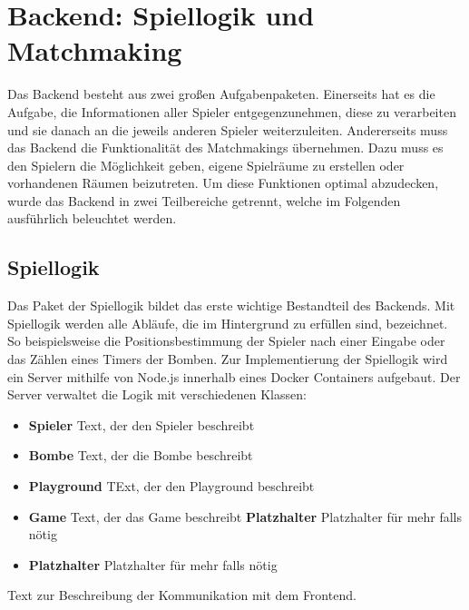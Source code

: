 \documentclass[conference]{IEEEtran}
\begin{document}
\section{Backend: Spiellogik und Matchmaking}
Das Backend besteht aus zwei großen Aufgabenpaketen. Einerseits hat es die Aufgabe, die Informationen aller Spieler entgegenzunehmen, diese zu verarbeiten und sie danach an die jeweils anderen Spieler weiterzuleiten. Andererseits muss das Backend die Funktionalität des Matchmakings übernehmen. Dazu muss es den Spielern die Möglichkeit geben, eigene Spielräume zu erstellen oder vorhandenen Räumen beizutreten. Um diese Funktionen optimal abzudecken, wurde das Backend in zwei Teilbereiche getrennt, welche im Folgenden ausführlich beleuchtet werden.
\subsection{Spiellogik}
Das Paket der Spiellogik bildet das erste wichtige Bestandteil des Backends. Mit Spiellogik werden alle Abläufe, die im Hintergrund zu erfüllen sind, bezeichnet. So beispielsweise die Positionsbestimmung der Spieler nach einer Eingabe oder das Zählen eines Timers der Bomben. Zur Implementierung der Spiellogik wird ein Server mithilfe von Node.js innerhalb eines Docker Containers aufgebaut. Der Server verwaltet die Logik mit verschiedenen Klassen:

\begin{itemize}
    \item \textbf{Spieler}
    Text, der den Spieler beschreibt
    \smallskip
    \item \textbf{Bombe} 
    Text, der die Bombe beschreibt
    \smallskip
    \item \textbf{Playground}
    TExt, der den Playground beschreibt
    \smallskip
    \item \textbf{Game}
    Text, der das Game beschreibt
    \smallskip
    \subitem \textbf{Platzhalter}
    Platzhalter für mehr falls nötig 
    \smallskip
    \item \textbf{Platzhalter}
    Platzhalter für mehr falls nötig 
\end{itemize}

Text zur Beschreibung der Kommunikation mit dem Frontend.
\end{document}

